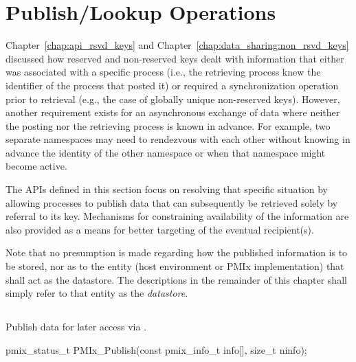 \chapter{Publish/Lookup Operations}
\label{chap:pub}

Chapter~\ref{chap:api_rsvd_keys} and Chapter~\ref{chap:data_sharing:non_rsvd_keys} 
discussed how reserved and non-reserved keys dealt with
information that either was associated with a specific process (i.e., the
retrieving process knew the identifier of the process that posted it) or
required a synchronization operation prior to retrieval (e.g., the case of
globally unique non-reserved keys). However, another requirement exists for an
asynchronous exchange of data where neither the posting nor the retrieving
process is known in advance. For example, two separate namespaces may need to
rendezvous with each other without knowing in advance the identity of the other
namespace or when that namespace might become active.

The \acp{API} defined in this section focus on resolving that specific
situation by allowing processes to publish data that can subsequently be
retrieved solely by referral to its key. Mechanisms for constraining
availability of the information are also provided as a means for better
targeting of the eventual recipient(s).

Note that no presumption is made regarding how the published information is to be stored, nor as to the entity (host environment or \ac{PMIx} implementation) that shall act as the datastore. The descriptions in the remainder of this chapter shall simply refer to that entity as the \emph{datastore}.


\section{}

\summary

Publish data for later access via .

\format

\cspecificstart
\begin{codepar}
pmix_status_t
PMIx_Publish(const pmix_info_t info[], size_t ninfo);
\end{codepar}
\cspecificend

